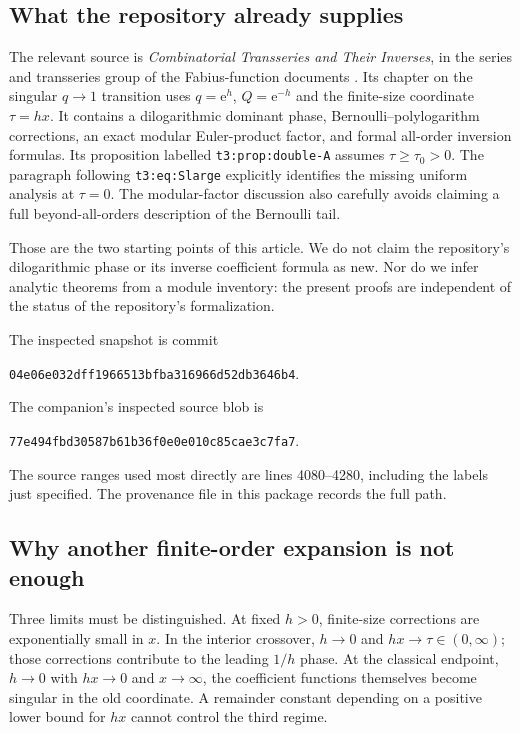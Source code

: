 \documentclass[11pt,a4paper]{article}
\numberwithin{equation}{section}
\theoremstyle{definition}\newtheorem{definition}[theorem]{Definition}
\theoremstyle{remark}\newtheorem{remark}[theorem]{Remark}
\newcommand{\e}{\mathrm e}
\begin{document}
\subsection{What the repository already supplies}
The relevant source is \emph{Combinatorial Transseries and Their Inverses},
in the series and transseries group of the Fabius-function documents
\cite{repo-companion,repo-readme}. Its chapter on the singular $q\to1$
transition uses $q=\e^h$, $Q=\e^{-h}$ and the finite-size coordinate $\tau=hx$.
It contains a dilogarithmic dominant phase, Bernoulli--polylogarithm corrections,
an exact modular Euler-product factor, and formal all-order inversion formulas.
Its proposition labelled \texttt{t3:prop:double-A} assumes $\tau\ge\tau_0>0$.
The paragraph following \texttt{t3:eq:Slarge} explicitly identifies the missing
uniform analysis at $\tau=0$. The modular-factor discussion also carefully
avoids claiming a full beyond-all-orders description of the Bernoulli tail.

Those are the two starting points of this article. We do not claim the
repository's dilogarithmic phase or its inverse coefficient formula as new.
Nor do we infer analytic theorems from a module inventory: the present proofs
are independent of the status of the repository's formalization.

The inspected snapshot is commit
\begin{center}\small\texttt{04e06e032dff1966513bfba316966d52db3646b4}.\end{center}
The companion's inspected source blob is
\begin{center}\small\texttt{77e494fbd30587b61b36f0e0e010c85cae3c7fa7}.\end{center}
The source ranges used most directly are lines 4080--4280, including the labels
just specified. The provenance file in this package records the full path.

\subsection{Why another finite-order expansion is not enough}
Three limits must be distinguished. At fixed $h>0$, finite-size corrections
are exponentially small in $x$. In the interior crossover, $h\to0$ and
$hx\to\tau\in(0,\infty)$; those corrections contribute to the leading
$1/h$ phase. At the classical endpoint, $h\to0$ with $hx\to0$ and $x\to\infty$,
the coefficient functions themselves become singular in the old coordinate.
A remainder constant depending on a positive lower bound for $hx$ cannot
control the third regime.
\end{document}
